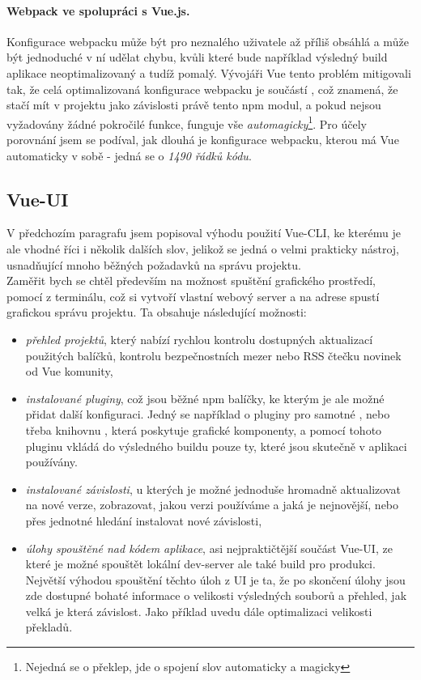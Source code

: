 \paragraph{Webpack ve spolupráci s Vue.js.} Konfigurace webpacku může být pro neznalého uživatele až příliš obsáhlá a může být jednoduché v ní udělat chybu, kvůli které bude například výsledný build aplikace neoptimalizovaný a tudíž pomalý. Vývojáři Vue tento problém mitigovali tak, že celá optimalizovaná konfigurace webpacku je součástí , což znamená, že stačí mít v projektu jako závislosti právě tento npm modul, a pokud nejsou vyžadovány žádné pokročilé funkce, funguje vše \emph{automagicky}\footnote{Nejedná se o překlep, jde o spojení slov automaticky a magicky}. Pro účely porovnání jsem se podíval, jak dlouhá je konfigurace webpacku, kterou má Vue automaticky v sobě - jedná se o \emph{1490 řádků kódu}.


\subsection{Vue-UI}

V předchozím paragrafu jsem popisoval výhodu použití Vue-CLI, ke kterému je ale vhodné říci i několik dalších slov, jelikož se jedná o velmi prakticky nástroj, usnadňující mnoho běžných požadavků na správu projektu.\\
Zaměřit bych se chtěl především na možnost spuštění grafického prostředí, pomocí  z terminálu, což si vytvoří vlastní webový server a na adrese  spustí grafickou správu projektu. Ta obsahuje následující možnosti:
\begin{itemize}
    \item \emph{přehled projektů}, který nabízí rychlou kontrolu dostupných aktualizací použitých balíčků, kontrolu bezpečnostních mezer nebo RSS čtečku novinek od Vue komunity,
    \item \emph{instalované pluginy}, což jsou běžné npm balíčky, ke kterým je ale možné přidat další konfiguraci. Jedný se například o pluginy pro samotné ,  nebo třeba knihovnu , která poskytuje grafické komponenty, a pomocí tohoto pluginu vkládá do výsledného buildu pouze ty, které jsou skutečně v aplikaci používány.
    \item \emph{instalované závislosti}, u kterých je možné jednoduše hromadně aktualizovat na nové verze, zobrazovat, jakou verzi používáme a jaká je nejnovější, nebo přes jednotné hledání instalovat nové závislosti,
    \item \emph{úlohy spouštěné nad kódem aplikace}, asi nejpraktičtější součást Vue-UI, ze které je možné spouštět lokální dev-server ale také build pro produkci. Největší výhodou spouštění těchto úloh z UI je ta, že po skončení úlohy jsou zde dostupné bohaté informace o velikosti výsledných souborů a přehled, jak velká je která závislost. Jako příklad uvedu dále optimalizaci velikosti překladů.
\end{itemize}


